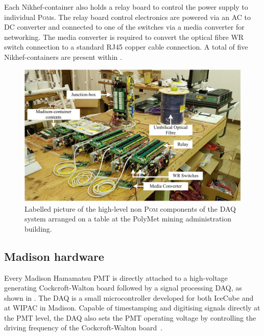 Each Nikhef-container also holds a relay board to control the power supply to individual
\textsc{Pom}s. The relay board control electronics are powered via an AC to DC converter and
connected to one of the switches via a media converter for networking. The media converter is
required to convert the optical fibre WR switch connection to a standard RJ45 copper cable
connection. A total of five Nikhef-containers are present within \chipsfive.

\begin{figure} %
    \includegraphics[width=\textwidth]{diagrams/5-daq/full_setup.pdf}
    \caption[Labelled picture of the high-level components of the \chipsfive DAQ system]
    {Labelled picture of the high-level non \textsc{Pom} components of the \chipsfive DAQ system
        arranged on a table at the PolyMet mining administration building.}
    \label{fig:full_setup}
\end{figure}

\subsection{Madison hardware} %
\label{sec:daq_hard_madison} %

Every Madison Hamamatsu PMT is directly attached to a high-voltage generating Cockcroft-Walton
board followed by a signal processing \si{\micro}DAQ, as shown in
. The \si{\micro}DAQ is a small microcontroller developed for
both IceCube and \chips at WIPAC in Madison. Capable of timestamping and digitising signals
directly at the PMT level, the \si{\micro}DAQ also sets the PMT operating voltage by controlling the
driving frequency of the Cockcroft-Walton board~\cite{eijk2018}.

